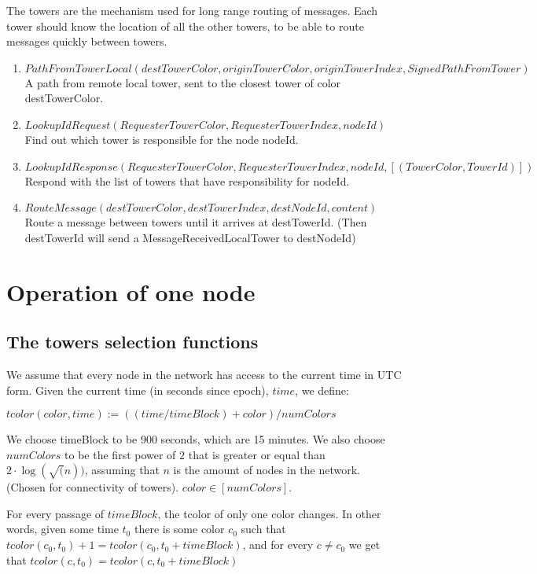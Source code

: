 \documentclass{amsart}
\theoremstyle{definition}
\theoremstyle{remark}
\numberwithin{equation}{section}
\begin{document}
The towers are the mechanism used for long range routing of messages.
Each tower should know the location of all the other towers, to be able to route
messages quickly between towers.

\begin{enumerate}
  \item $PathFromTowerLocal(destTowerColor, originTowerColor, originTowerIndex, 
    SignedPathFromTower)$
    A path from remote local tower, sent to the closest tower of color destTowerColor.

  \item $LookupIdRequest(RequesterTowerColor, RequesterTowerIndex, nodeId)$
    Find out which tower is responsible for the node nodeId.

  \item $LookupIdResponse(RequesterTowerColor, RequesterTowerIndex, nodeId, 
    [(TowerColor, TowerId)])$
    Respond with the list of towers that have responsibility for nodeId.

  \item $RouteMessage(destTowerColor, destTowerIndex, destNodeId, content)$
    Route a message between towers until it arrives at destTowerId.
    (Then destTowerId will send a MessageReceivedLocalTower to destNodeId)
\end{enumerate}


\section{Operation of one node}

\subsection{The towers selection functions}

We assume that every node in the network has access to the current time in UTC
form. Given the current time (in seconds since epoch), $time$, we define:

$tcolor(color, time) := ((time / timeBlock) + color) / numColors$

We choose timeBlock to be 900 seconds, which are 15 minutes. We also choose
$numColors$ to be the first power of $2$ that is greater or equal than
$2\cdot\log(\sqrt(n))$, assuming that $n$ is the amount of nodes in the network. 
(Chosen for connectivity of towers). $color \in [numColors]$.

For every passage of $timeBlock$, the tcolor of only one color changes. In other
words, given some time $t_0$ there is some color $c_0$ such that $tcolor(c_0,t_0) +
1 = tcolor(c_0, t_0 + timeBlock)$, and for every $c \neq c_0$ we get that
$tcolor(c,t_0) = tcolor(c, t_0 + timeBlock)$
\end{document}
